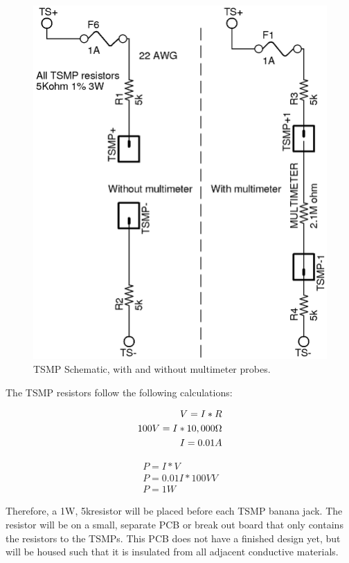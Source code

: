 \documentclass{article}
\begin{document}
    \begin{figure}
        \centering
        \includegraphics{TSMP}
        \caption{TSMP Schematic, with and without multimeter probes.}
        \label{tsmpschem}
    \end{figure}

    The TSMP resistors follow the following calculations:

                \begin{align}
                V = I * R \\
                100 V = I * 10,000 \ohm \\
                I = 0.01A
            \end{align}

            \begin{align}
                P = I * V \\
                P = 0.01 I * 100V V \\
                P = 1 W
            \end{align}

            Therefore, a 1W, 5k\ohm resistor will be placed before each TSMP banana jack. The resistor will be on a small, separate PCB or break out board that only contains the resistors to the TSMPs. This PCB does not have a finished design yet, but will be housed such that it is insulated from all adjacent conductive materials.\\
\end{document}
